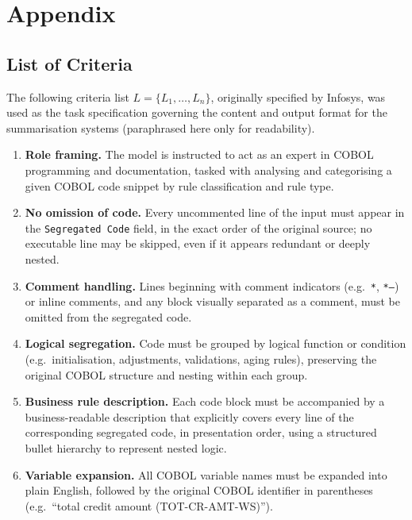 \section{Appendix}
\subsection{List of Criteria}

The following criteria list $L = \{L_1, \dots, L_n\}$, originally
specified by Infosys, was used as the task specification governing the
content and output format for the summarisation systems (paraphrased here only for readability).

\begin{enumerate}[label=$L_{\arabic*}$:, leftmargin=2.2em]

\item \textbf{Role framing.} The model is instructed to act as an expert in
COBOL programming and documentation, tasked with analysing and categorising
a given COBOL code snippet by rule classification and rule type.

\item \textbf{No omission of code.} Every uncommented line of the input
must appear in the \texttt{Segregated Code} field, in the exact order of
the original source; no executable line may be skipped, even if it appears
redundant or deeply nested.

\item \textbf{Comment handling.} Lines beginning with comment indicators
(e.g.\ \texttt{*}, \texttt{*---}) or inline comments, and any block visually
separated as a comment, must be omitted from the segregated code.

\item \textbf{Logical segregation.} Code must be grouped by logical
function or condition (e.g.\ initialisation, adjustments, validations,
aging rules), preserving the original COBOL structure and nesting within
each group.

\item \textbf{Business rule description.} Each code block must be
accompanied by a business-readable description that explicitly covers
every line of the corresponding segregated code, in presentation order,
using a structured bullet hierarchy to
represent nested logic.

\item \textbf{Variable expansion.} All COBOL variable names must be
expanded into plain English, followed by the original COBOL identifier in
parentheses (e.g.\ ``total credit amount (TOT-CR-AMT-WS)'').


\end{enumerate}
